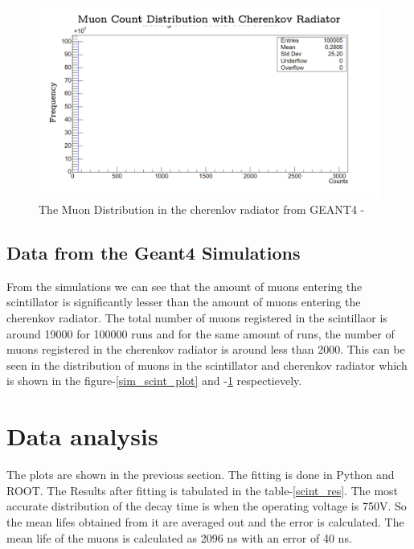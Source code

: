 \documentclass{article}
\begin{document}
\begin{multicols}{2}
\begin{figure}[H]
    \centering
    \includegraphics[width = \columnwidth]{Images/cher_muon_dist.png}
    \caption{The Muon Distribution in the cherenlov radiator from GEANT4 -\cite{agostinelli2003geant4}}
    \label{sim_cher_plot}
\end{figure}


\subsection{Data from the Geant4 Simulations}

From the simulations we can see that the amount of muons entering the scintillator is significantly lesser than the amount of muons entering the cherenkov radiator. The total number of muons registered in the scintillaor is around 19000 for 100000 runs and for the same amount of runs, the number of muons registered in the cherenkov radiator is around less than 2000. This can be seen in the distribution of muons in the scintillator and cherenkov radiator which is shown in the figure-\ref{sim_scint_plot} and -\ref{sim_cher_plot} respectievely.




\section{\label{dataanalysis}Data analysis}


The plots are shown in the previous section. The fitting is done in Python and ROOT. The Results after fitting is tabulated in the table-\ref{scint_res}. The most accurate distribution of the decay time is when the operating voltage is 750V. So the mean lifes obtained from it are averaged out and the error is calculated. The mean life of the muons is calculated as 2096 ns with an error of 40 ns.



\end{multicols}
\end{document}
